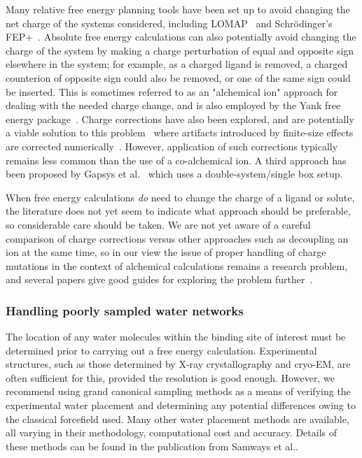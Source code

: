 \documentclass[9pt,bestpractices,pubversion]{livecoms}
\begin{document}
Many relative free energy planning tools have been set up to avoid changing the net charge of the systems considered, including LOMAP~\cite{liu2013lead} and Schr\"{o}dinger's FEP+~\cite{wang2015accurate}. Absolute free energy calculations can also potentially avoid changing the charge of the system by making a charge perturbation of equal and opposite sign elsewhere in the system; for example, as a charged ligand is removed, a charged counterion of opposite sign could also be removed, or one of the same sign could be inserted. This is sometimes referred to as an "alchemical ion" approach for dealing with the needed charge change, and is also employed by the Yank free energy package~\cite{wang2013identifying}.
Charge corrections have also been explored, and are potentially a viable solution to this problem~\cite{mey2018impact} where artifacts introduced by finite-size effects are corrected numerically~\cite{chen2018accurate, ohlknecht2020correcting}. However, application of such corrections typically remains less common than the use of a co-alchemical ion. A third approach has been proposed by Gapsys et al.~\cite{gapsys2015calculation} which uses a double-system/single box setup. 

When free energy calculations \emph{do} need to change the charge of a ligand or solute, the literature does not yet seem to indicate what approach should be preferable, so considerable care should be taken.
We are not yet aware of a careful comparison of charge corrections versus other approaches such as decoupling an ion at the same time, so in our view the issue of proper handling of charge mutations in the context of alchemical calculations remains a research problem, and several papers give good guides for exploring the problem further~\cite{lin2014overview, ohlknecht2020correcting, rocklin2013calculating}.

\subsubsection{Handling poorly sampled water networks}
The location of any water molecules within the binding site of interest must be determined prior to carrying out a free energy calculation. Experimental structures, such as those determined by X-ray crystallography and cryo-EM, are often sufficient for this, provided the resolution is good enough. However, we recommend using grand canonical sampling methods\cite{melling2023enhanced, samways2020grand} as a means of verifying the experimental water placement and determining any potential differences owing to the classical forcefield used. Many other water placement methods are available, all varying in their methodology, computational cost and accuracy. Details of these methods can be found in the publication from Samways et al.\cite{samways2021water}.
\end{document}

